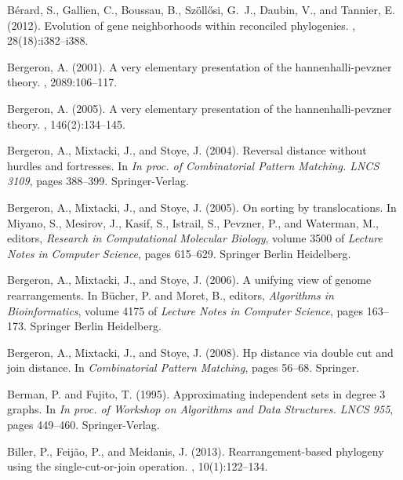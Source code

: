 \documentclass[11pt,final,twoside,nofrench]{thlifl}
\begin{document}
\begin{thebibliography}{}
B{\'e}rard, S., Gallien, C., Boussau, B., Sz{\"o}ll{\H{o}}si, G.~J., Daubin,
  V., and Tannier, E. (2012).
\newblock Evolution of gene neighborhoods within reconciled phylogenies.
, 28(18):i382--i388.

Bergeron, A. (2001).
\newblock A very elementary presentation of the hannenhalli-pevzner theory.
, 2089:106--117.

Bergeron, A. (2005).
\newblock A very elementary presentation of the hannenhalli-pevzner theory.
, 146(2):134--145.

Bergeron, A., Mixtacki, J., and Stoye, J. (2004).
\newblock Reversal distance without hurdles and fortresses.
\newblock In {\em In proc. of Combinatorial Pattern Matching. LNCS 3109}, pages
  388--399. Springer-Verlag.

Bergeron, A., Mixtacki, J., and Stoye, J. (2005).
\newblock On sorting by translocations.
\newblock In Miyano, S., Mesirov, J., Kasif, S., Istrail, S., Pevzner, P., and
  Waterman, M., editors, {\em Research in Computational Molecular Biology},
  volume 3500 of {\em Lecture Notes in Computer Science}, pages 615--629.
  Springer Berlin Heidelberg.

Bergeron, A., Mixtacki, J., and Stoye, J. (2006).
\newblock A unifying view of genome rearrangements.
\newblock In Bücher, P. and Moret, B., editors, {\em Algorithms in
  Bioinformatics}, volume 4175 of {\em Lecture Notes in Computer Science},
  pages 163--173. Springer Berlin Heidelberg.

Bergeron, A., Mixtacki, J., and Stoye, J. (2008).
\newblock Hp distance via double cut and join distance.
\newblock In {\em Combinatorial Pattern Matching}, pages 56--68. Springer.

Berman, P. and Fujito, T. (1995).
\newblock Approximating independent sets in degree 3 graphs.
\newblock In {\em In proc. of Workshop on Algorithms and Data Structures. LNCS
  955}, pages 449--460. Springer-Verlag.

Biller, P., Feij{\~a}o, P., and Meidanis, J. (2013).
\newblock Rearrangement-based phylogeny using the single-cut-or-join operation.
, 10(1):122--134.


\end{thebibliography}
\end{document}
